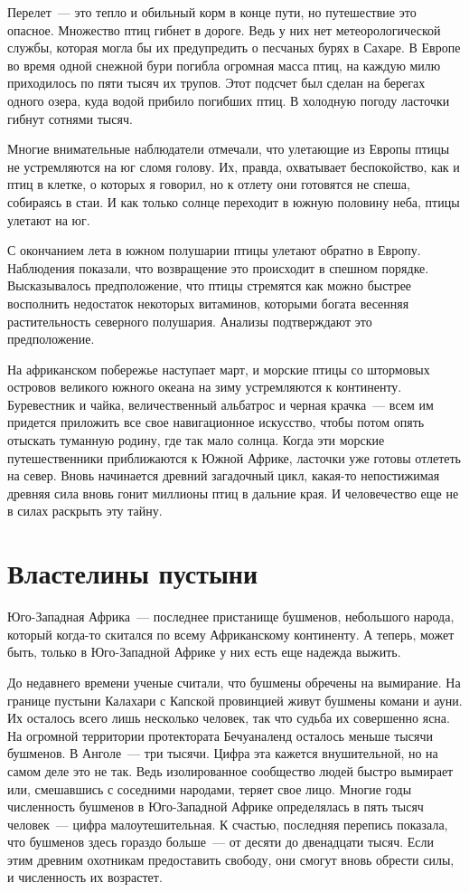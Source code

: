 \documentclass[12pt,a4paper,twoside,openany,svgnames]{memoir}
\begin{document}
Перелет~--- это тепло и обильный корм в конце пути, но путешествие это опасное. Множество птиц гибнет в дороге. Ведь у них нет метеорологической службы, которая могла бы их предупредить о песчаных бурях в Сахаре. В Европе во время одной снежной бури погибла огромная масса птиц, на каждую милю приходилось по пяти тысяч их трупов. Этот подсчет был сделан на берегах одного озера, куда водой прибило погибших птиц. В холодную погоду ласточки гибнут сотнями тысяч.

Многие внимательные наблюдатели отмечали, что улетающие из Европы птицы не устремляются на юг сломя голову. Их, правда, охватывает беспокойство, как и птиц в клетке, о которых я говорил, но к отлету они готовятся не спеша, собираясь в стаи. И как только солнце переходит в южную половину неба, птицы улетают на юг.

С окончанием лета в южном полушарии птицы улетают обратно в Европу. Наблюдения показали, что возвращение это происходит в спешном порядке. Высказывалось предположение, что птицы стремятся как можно быстрее восполнить недостаток некоторых витаминов, которыми богата весенняя растительность северного полушария. Анализы подтверждают это предположение.

На африканском побережье наступает март, и морские птицы со штормовых островов великого южного океана на зиму устремляются к континенту. Буревестник и чайка, величественный альбатрос и черная крачка~--- всем им придется приложить все свое навигационное искусство, чтобы потом опять отыскать туманную родину, где так мало солнца. Когда эти морские путешественники приближаются к Южной Африке, ласточки уже готовы отлететь на север. Вновь начинается древний загадочный цикл, какая-то непостижимая древняя сила вновь гонит миллионы птиц в дальние края. И человечество еще не в силах раскрыть эту тайну.

\chapter{Властелины пустыни}

Юго-Западная Африка~--- последнее пристанище бушменов, небольшого народа, который когда-то скитался по всему Африканскому континенту. А теперь, может быть, только в Юго-Западной Африке у них есть еще надежда выжить.

До недавнего времени ученые считали, что бушмены обречены на вымирание. На границе пустыни Калахари с Капской провинцией живут бушмены комани и ауни. Их осталось всего лишь несколько человек, так что судьба их совершенно ясна. На огромной территории протектората Бечуаналенд осталось меньше тысячи бушменов. В Анголе~--- три тысячи. Цифра эта кажется внушительной, но на самом деле это не так. Ведь изолированное сообщество людей быстро вымирает или, смешавшись с соседними народами, теряет свое лицо. Многие годы численность бушменов в Юго-Западной Африке определялась в пять тысяч человек~--- цифра малоутешительная. К счастью, последняя перепись показала, что бушменов здесь гораздо больше~--- от десяти до двенадцати тысяч. Если этим древним охотникам предоставить свободу, они смогут вновь обрести силы, и численность их возрастет.
\end{document}
